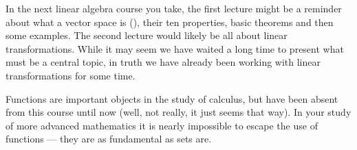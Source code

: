 \begin{para}In the next linear algebra course you take, the first lecture might be a reminder about what a vector space is (), their ten properties, basic theorems and then some examples.  The second lecture would likely be all about linear transformations.  While it may seem we have waited a long time to present what must be a central topic, in truth we have already been working with linear transformations for some time.\end{para}
%
\begin{para}Functions are important objects in the study of calculus, but have been absent from this course until now (well, not really, it just seems that way).  In your study of more advanced mathematics it is nearly impossible to escape the use of functions --- they are as fundamental as sets are.\end{para}

